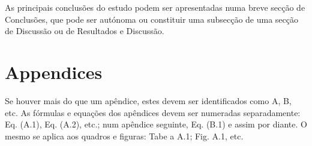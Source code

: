 \documentclass[a4paper,fleqn]{cas-sc}
\begin{document}
As principais conclusões do estudo podem ser apresentadas numa breve secção de Conclusões, que pode ser autónoma ou constituir uma subsecção de uma secção de Discussão ou de Resultados e Discussão.

\section{Appendices}\label{}

Se houver mais do que um apêndice, estes devem ser identificados como A, B, etc. As fórmulas e equações dos apêndices devem ser numeradas separadamente: Eq. (A.1), Eq. (A.2), etc.; num apêndice seguinte,
Eq. (B.1) e assim por diante. O mesmo se aplica aos quadros e figuras: Tabe a A.1; Fig. A.1, etc.





%
%
\end{document}
